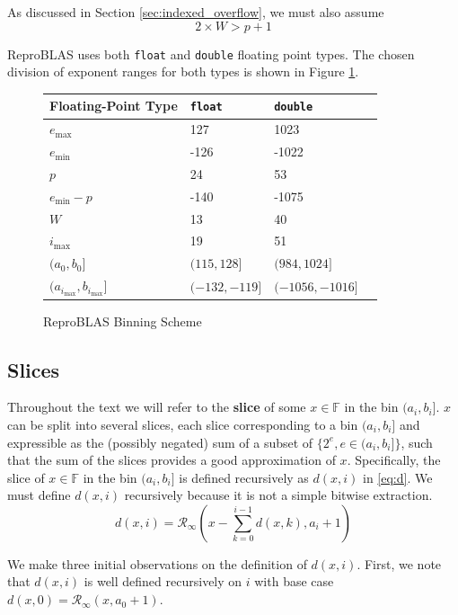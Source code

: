 \documentclass[12pt]{article}
\providecommand{\F}{\ensuremath{\mathbb{F}}}
\providecommand{\min}{\ensuremath{\text{min}}}
\providecommand{\max}{\ensuremath{\text{max}}}
\providecommand{\roundtonearestinfty}{\ensuremath{\mathcal{R}_\text{$\infty$}}}
\theoremstyle{definition}
\numberwithin{equation}{section}
\numberwithin{figure}{section}
\begin{document}
    As discussed in Section \ref{sec:indexed_overflow}, we must also assume
    \begin{equation}
      2\times W > p + 1
      \label{eq:wlower}
    \end{equation}

    ReproBLAS uses both \texttt{float} and \texttt{double} floating point types. The chosen division of exponent ranges for both types is shown in Figure \ref{fig:bins}.
    \begin{figure}[H] \centering\begin{tabular}{ | l | l | l | p{5cm} |} \hline Floating-Point Type & \texttt{float} & \texttt{double}\\ \hline $e_{\max}$ & 127 & 1023\\ \hline $e_{\min}$ &  -126 & -1022 \\ \hline $p$ & 24 & 53 \\ \hline $e_{\min} - p$ & -140 & -1075 \\ \hline $W$ & 13 & 40 \\ \hline $i_{\max}$ & 19 & 51 \\ \hline $(a_0, b_0]$ & $(115, 128]$ & $(984, 1024]$\\ \hline $(a_{i_{\max}}, b_{i_{\max}}]$ & $(-132, -119]$ & $(-1056, -1016]$ \\ \hline\end{tabular} \caption{ReproBLAS Binning Scheme}\label{fig:bins}\end{figure}

  \subsection{Slices}
    \label{sec:binning_slices}
    Throughout the text we will refer to the \textbf{slice} of some $x \in \F$ in the bin $(a_i, b_i]$. $x$ can be split into several slices, each slice corresponding to a bin $(a_i, b_i]$ and expressible as the (possibly negated) sum of a subset of $\{2^e, e \in (a_i, b_i]\}$, such that the sum of the slices provides a good approximation of $x$. Specifically, the slice of $x \in \F$ in the bin $(a_i, b_i]$ is defined recursively as $d(x, i)$ in \eqref{eq:d}. We must define $d(x, i)$ recursively because it is not a simple bitwise extraction.
    \begin{equation}
      d(x, i) = \roundtonearestinfty(x - \sum\limits_{k=0}^{i - 1}d(x,k), a_i + 1)
      \label{eq:d}
    \end{equation}

    We make three initial observations on the definition of $d(x, i)$. First, we note that $d(x, i)$ is well defined recursively on $i$ with base case $d(x, 0) = \roundtonearestinfty(x, a_0 + 1)$.
\end{document}
